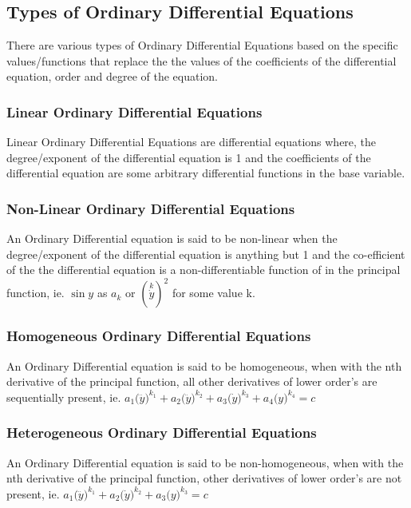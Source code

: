 

\subsection{{Types of Ordinary Differential Equations}}
	
	{There are various types of Ordinary Differential Equations based on the specific values/functions that replace the the values of the coefficients of the differential equation, order and degree of the equation.}	
	
	\subsubsection{{Linear Ordinary Differential Equations}}

		{Linear Ordinary Differential Equations are differential equations where, the degree/exponent of the differential equation is 1 and the coefficients of the differential equation are some arbitrary differential functions in the base variable.}

	\subsubsection{{Non-Linear Ordinary Differential Equations}}

		{An Ordinary Differential equation is said to be non-linear when the degree/exponent of the differential equation is anything but 1 and the co-efficient of the the differential equation is a non-differentiable function of in the principal function, ie. $\sin{y}$ as $a_k$ or $\left(\overset{k}{\dot{y}}\right)^2$ for some value k.}

	\subsubsection{{Homogeneous Ordinary Differential Equations}}

		{An Ordinary Differential equation is said to be homogeneous, when with the nth derivative of the principal function, all other derivatives of lower order's are sequentially present, ie. $a_{1}\bigg(\dddot{y}\bigg)^{k_1} + a_{2}\bigg(\ddot{y}\bigg)^{k_2} + a_{3}\bigg(\dot{y}\bigg)^{k_3} + a_{4}\bigg(y\bigg)^{k_4} = c$}

	\subsubsection{{Heterogeneous Ordinary Differential Equations}}

	{An Ordinary Differential equation is said to be non-homogeneous, when with the nth derivative of the principal function, other derivatives of lower order's are not present, ie. $a_{1}\bigg(\dddot{y}\bigg)^{k_1} + a_{2}\bigg(\dot{y}\bigg)^{k_2} + a_{3}\bigg(y\bigg)^{k_3} = c$}


